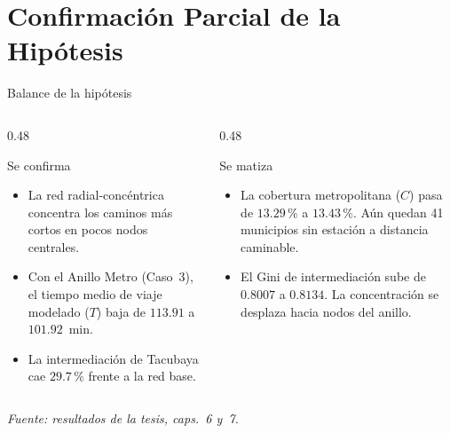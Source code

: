 
\section{Confirmación Parcial de la Hipótesis}

\begin{frame}{Balance de la hipótesis}
  \begin{columns}[T,onlytextwidth]
    \begin{column}{0.48\textwidth}
      \begin{block}{Se confirma}
        \begin{itemize}
          \item La red radial-concéntrica concentra los caminos más cortos en
                pocos nodos centrales.
          \item Con el Anillo Metro (Caso~3), el tiempo medio de viaje modelado
                ($T$) baja de $113.91$ a $101.92$~min.
          \item La intermediación de Tacubaya cae
                $29.7\,\text{\%}$ frente a la red base.
        \end{itemize}
      \end{block}
    \end{column}
    \begin{column}{0.48\textwidth}
      \begin{alertblock}{Se matiza}
        \begin{itemize}
          \item La cobertura metropolitana ($C$) pasa de
                $13.29\,\text{\%}$ a $13.43\,\text{\%}$.
                Aún quedan 41 municipios sin estación a distancia caminable.
          \item El Gini de intermediación sube de $0.8007$ a $0.8134$.
                La concentración se desplaza hacia nodos del anillo.
        \end{itemize}
      \end{alertblock}
    \end{column}
  \end{columns}

  \medskip
  {\footnotesize\itshape Fuente: resultados de la tesis, caps.~6 y~7.\par}
\end{frame}

